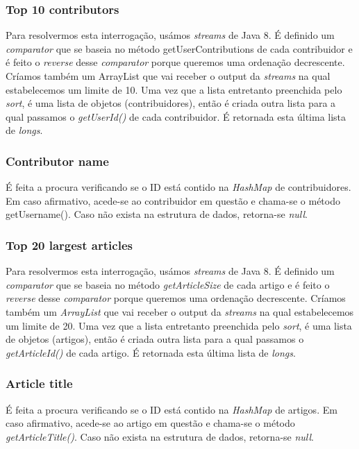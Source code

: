 \documentclass[a4paper]{article}
\begin{document}
\subsubsection{Top 10 contributors}
Para resolvermos esta interrogação, usámos \textit{streams} de Java 8. É definido um \textit{comparator} que se baseia no método getUserContributions de cada contribuidor e é feito o \textit{reverse} desse \textit{comparator} porque queremos uma ordenação decrescente. Críamos também um ArrayList que vai receber o output da \textit{streams} na qual estabelecemos um limite de 10. Uma vez que a lista entretanto preenchida pelo \textit{sort}, é uma lista de objetos (contribuidores), então é criada outra lista para a qual passamos o \textit{getUserId()} de cada contribuidor. É retornada esta última lista de \textit{longs}.

\subsubsection{Contributor name}
É feita a procura verificando se o ID está contido na \textit{HashMap} de contribuidores. Em caso afirmativo, acede-se ao contribuidor em questão e chama-se o método getUsername(). Caso não exista na estrutura de dados, retorna-se \textit{null}.

\subsubsection{Top 20 largest articles}
Para resolvermos esta interrogação, usámos \textit{streams} de Java 8. É definido um \textit{comparator} que se baseia no método \textit{getArticleSize} de cada artigo e é feito o \textit{reverse} desse \textit{comparator} porque queremos uma ordenação decrescente. Críamos também um \textit{ArrayList} que vai receber o output da \textit{streams} na qual estabelecemos um limite de 20. Uma vez que a lista entretanto preenchida pelo \textit{sort}, é uma lista de objetos (artigos), então é criada outra lista para a qual passamos o \textit{getArticleId()} de cada artigo. É retornada esta última lista de \textit{longs}.

\subsubsection{Article title}
É feita a procura verificando se o ID está contido na \textit{HashMap} de artigos. Em caso afirmativo, acede-se ao artigo em questão e chama-se o método \textit{getArticleTitle()}. Caso não exista na estrutura de dados, retorna-se \textit{null}.
\end{document}

